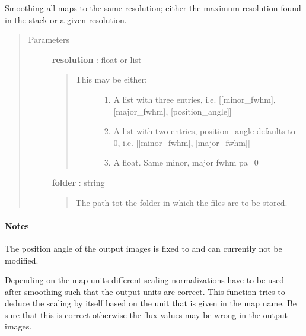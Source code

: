 \documentclass[a4paper,10pt,english]{sphinxmanual}
\begin{document}
\begin{fulllineitems}
\begin{fulllineitems}
\end{fulllineitems}


\begin{fulllineitems}
\label{maps:astrolyze.maps.stack.Stack.unify_resolutions}
Smoothing all maps to the same resolution; either the maximum
resolution found in the stack or a given resolution.
\begin{quote}\begin{description}
\item[{Parameters }] \leavevmode
\textbf{resolution} : float or list
\begin{quote}
\begin{description}
\item[{This may be either:}] \leavevmode\begin{enumerate}
\item {} 
A list with three entries, i.e.
{[}{[}minor\_fwhm{]}, {[}major\_fwhm{]}, {[}position\_angle{]}{]}

\item {} 
A list with two entries, position\_angle defaults to 0, i.e.
{[}{[}minor\_fwhm{]}, {[}major\_fwhm{]}{]}

\item {} 
A float. Same minor, major fwhm pa=0

\end{enumerate}

\end{description}
\end{quote}

\textbf{folder} : string
\begin{quote}

The path tot the folder in which the files are to be stored.
\end{quote}

\end{description}\end{quote}
\paragraph{Notes}

The position angle of the output images is fixed to  and can
currently not be modified.

Depending on the map units different scaling normalizations have to be
used after smoothing such that the output units are correct. This
function tries to deduce the scaling by itself based on the unit that
is given in the map name. Be sure that this is correct otherwise the
flux values may be wrong in the output images.


\end{fulllineitems}
\end{fulllineitems}
\end{document}
